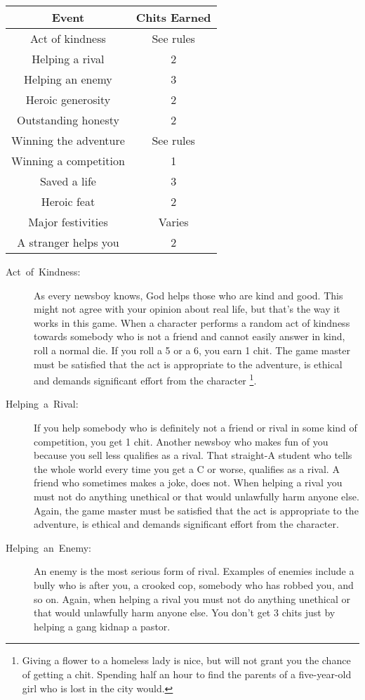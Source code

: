 \begin{longtable}{cc}
\hline
\toprule 
Event & Chits Earned\tabularnewline
\midrule
\hline
\endhead
\midrule 
Act of kindness & See rules\tabularnewline
\midrule 
Helping a rival & 2\tabularnewline
\midrule 
Helping an enemy & 3\tabularnewline
\midrule 
Heroic generosity & 2\tabularnewline
\midrule 
Outstanding honesty & 2\tabularnewline
\midrule 
Winning the adventure & See rules\tabularnewline
\midrule 
Winning a competition & 1\tabularnewline
\midrule 
Saved a life & 3\tabularnewline
\midrule 
Heroic feat & 2\tabularnewline
\midrule 
Major festivities & Varies\tabularnewline
\midrule 
A stranger helps you & 2\tabularnewline
\bottomrule
\end{longtable}
\begin{description}
\item [{Act~of~Kindness:}] As every newsboy knows, God helps those who
are kind and good. This might not agree with your opinion about real
life, but that's the way it works in this game. When a character performs
a random act of kindness towards somebody who is not a friend and
cannot easily answer in kind, roll a normal die. If you roll a 5 or
a 6, you earn 1 chit. The game master must be satisfied that the act
is appropriate to the adventure, is ethical and demands significant
effort from the character%
\footnote{Giving a flower to a homeless lady is nice, but will not grant you
the chance of getting a chit. Spending half an hour to find the parents
of a five-year-old girl who is lost in the city would.%
}. 
\item [{Helping~a~Rival:}] If you help somebody who is definitely not
a friend or rival in some kind of competition, you get 1 chit. Another
newsboy who makes fun of you because you sell less qualifies as a
rival. That straight-A student who tells the whole world every time
you get a C or worse, qualifies as a rival. A friend who sometimes
makes a joke, does not. When helping a rival you must not do anything
unethical or that would unlawfully harm anyone else. Again, the game
master must be satisfied that the act is appropriate to the adventure,
is ethical and demands significant effort from the character. 
\item [{Helping~an~Enemy:}] An enemy is the most serious form of rival.
Examples of enemies include a bully who is after you, a crooked cop,
somebody who has robbed you, and so on. Again, when helping a rival
you must not do anything unethical or that would unlawfully harm anyone
else. You don't get 3 chits just by helping a gang kidnap a pastor.

\end{description}
